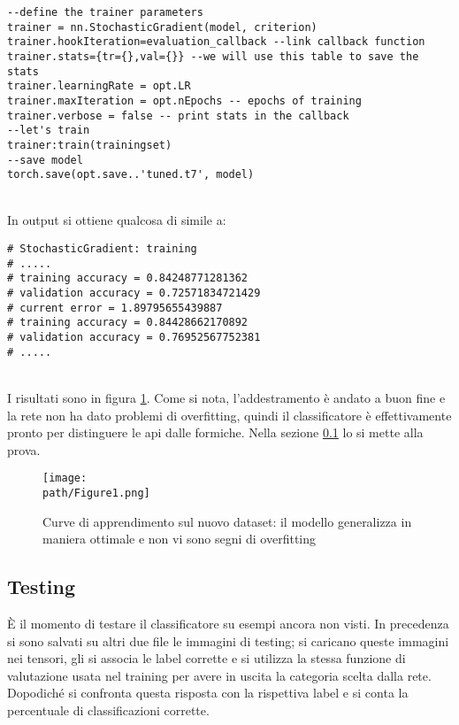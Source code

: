 \begin{lstlisting}[language={[5.2]Lua}]
--define the trainer parameters
trainer = nn.StochasticGradient(model, criterion)
trainer.hookIteration=evaluation_callback --link callback function
trainer.stats={tr={},val={}} --we will use this table to save the stats
trainer.learningRate = opt.LR
trainer.maxIteration = opt.nEpochs -- epochs of training
trainer.verbose = false -- print stats in the callback
--let's train
trainer:train(trainingset)
--save model
torch.save(opt.save..'tuned.t7', model)
\end{lstlisting}
\\
In output si ottiene qualcosa di simile a: 
\begin{lstlisting}	
# StochasticGradient: training
# .....	
# training accuracy = 0.84248771281362	
# validation accuracy = 0.72571834721429	
# current error = 1.89795655439887	
# training accuracy = 0.84428662170892	
# validation accuracy = 0.76952567752381
# .....	
\end{lstlisting}

\\
I risultati sono in figura \ref{fig:res-train}. Come si nota, l'addestramento è andato a buon fine e la rete non ha dato problemi di overfitting, quindi il classificatore è effettivamente pronto per distinguere le api dalle formiche. Nella sezione \ref{subsec:c6-testing} lo si mette alla prova. 
\begin{figure}[h!]
 \centering
 \texttt{[image: \\path/Figure1.png]} 
 \caption{Curve di apprendimento sul nuovo dataset: il modello generalizza in maniera ottimale e non vi sono segni di overfitting}
 \label{fig:res-train}
\end{figure}

\subsection{Testing}
\label{subsec:c6-testing}
È il momento di testare il classificatore su esempi ancora non visti. In precedenza si sono salvati su altri due file le immagini di testing; si caricano queste immagini nei tensori, gli si associa le label corrette e si utilizza la stessa funzione di valutazione usata nel training per avere in uscita la categoria scelta dalla rete. Dopodiché si confronta questa risposta con la rispettiva label e si conta la percentuale di classificazioni corrette. 

